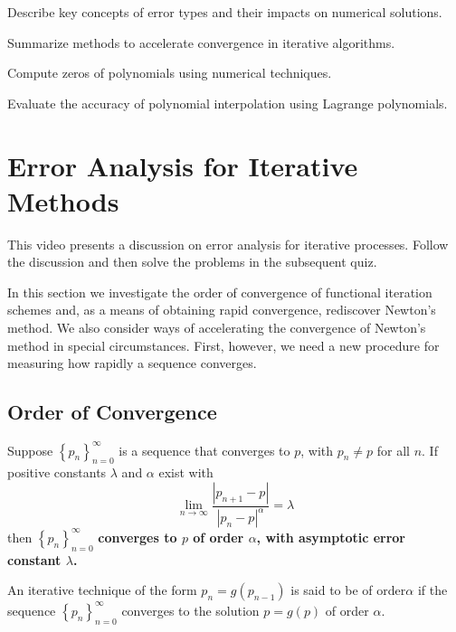 \begin{mlos}
\item Describe key concepts of error types and their impacts on numerical solutions.
\item Summarize methods to accelerate convergence in iterative algorithms.
\item Compute zeros of polynomials using numerical techniques.
\item Evaluate the accuracy of polynomial interpolation using Lagrange polynomials. 
\end{mlos}

\section{Error Analysis for Iterative Methods}
\videolesson
\begin{selfvideo}[1]
This video presents a discussion on error analysis for iterative processes. Follow the discussion and then solve the problems in the subsequent quiz.
\end{selfvideo}
In this section we investigate the order of convergence of functional iteration schemes and, as a means of obtaining rapid convergence, rediscover Newton’s method. We also consider ways of accelerating the convergence of Newton’s method in special circumstances. First, however, we need a new procedure for measuring how rapidly a sequence converges.

\subsection*{ Order of Convergence}
\begin{definition}
Suppose $\displaystyle\left\{p_n\right\}_{n=0}^{\infty}$ is a sequence that converges to $p$, with $p_n\neq p$ for all $n$. If positive constants $\lambda$ and $\alpha$ exist with
\[\lim_{n\rightarrow\infty}\frac{|p_{n+1}-p|}{|p_n-p|^{\alpha}}=\lambda\]
then $\displaystyle\left\{p_n\right\}_{n=0}^{\infty}$ {\bf converges to $p$ of order $\alpha$, with asymptotic error constant $\lambda$.}
\end{definition}

An iterative technique of the form $p_n = g(p_{n-1})$ is said to be of order$\alpha$ if the sequence $\displaystyle\left\{p_n\right\}_{n=0}^{\infty}$ converges to the solution $p = g(p)$ of order $\alpha$.

